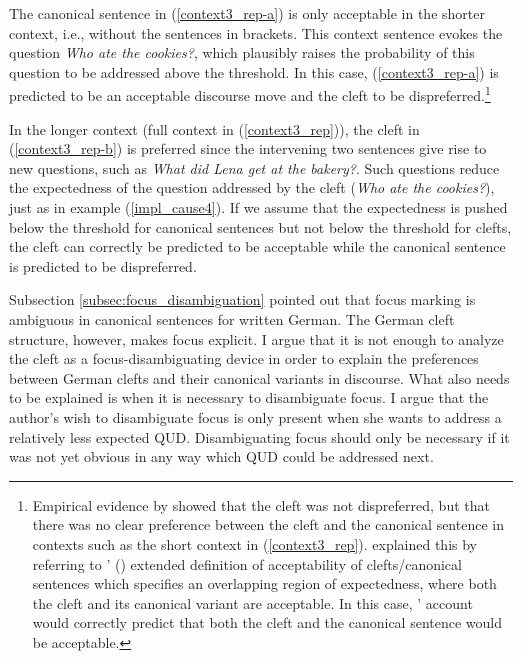\documentclass[output=paper,colorlinks,citecolor=brown]{langscibook}
\begin{document}
\noindent The canonical sentence in (\ref{context3_rep-a}) is only acceptable in the shorter context, i.e., without the sentences in brackets. This context sentence evokes the question \textit{Who ate the cookies?}, which plausibly raises the probability of this question to be addressed above the threshold. In this case, (\ref{context3_rep-a}) is predicted to be an acceptable discourse move and the cleft to be dispreferred.{\footnote{Empirical evidence by \citet{tonnis_tonhauser_2022} showed that the cleft was not dispreferred, but that there was no clear preference between the cleft and the canonical sentence in contexts such as the short context in (\ref{context3_rep}). \citeauthor{tonnis_tonhauser_2022} explained this by referring to \citeauthor{tonnis_2021}' (\citeyear{tonnis_2021}) extended definition of acceptability of clefts/canonical sentences which specifies an overlapping region of expectedness, where both the cleft and its canonical variant are acceptable. In this case, \citeauthor{tonnis_2021}' account would correctly predict that both the cleft and the canonical sentence would be acceptable.}}

In the longer context (full context in (\ref{context3_rep})), the cleft in (\ref{context3_rep-b}) is preferred since the intervening two sentences give rise to new questions, such as \textit{What did Lena get at the bakery?}. Such questions reduce the expectedness of the question addressed by the cleft (\textit{Who ate the cookies?}), just as in example (\ref{impl_cause4}). If we assume that the expectedness is pushed below the threshold for canonical sentences but not below the threshold for clefts, the cleft can correctly be predicted to be  acceptable while the canonical sentence is predicted to be dispreferred.

Subsection \ref{subsec:focus_disambiguation} pointed out that focus marking is ambiguous in canonical sentences for written German. The German cleft structure, however, makes focus explicit. I argue that it is not enough to analyze the cleft as a focus-disambiguating device in order to explain the preferences between German clefts and their canonical variants in discourse. What also needs to be explained is when it is necessary to disambiguate focus.  I argue that the author's wish to disambiguate focus is only present when she wants to address a relatively less expected QUD. Disambiguating focus should only be necessary if it was not yet obvious in any way which QUD could be addressed next. 
\end{document}
